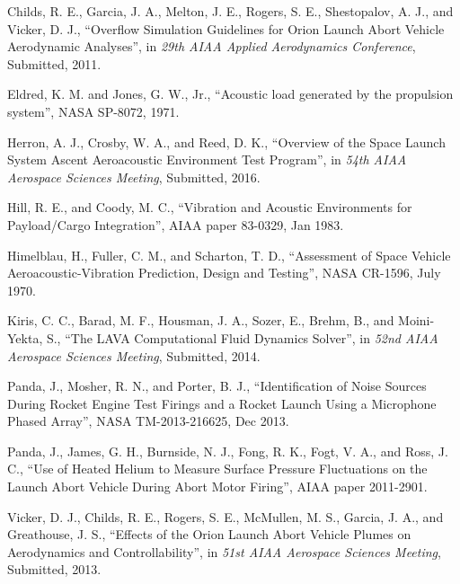 \documentclass[]{aiaa-tc}%
\begin{document}
\begin{thebibliography}{9}%

Childs, R. E., Garcia, J. A., Melton, J. E., Rogers, S. E., Shestopalov, A. J., and Vicker, D. J., ``Overflow Simulation Guidelines for Orion Launch
Abort Vehicle Aerodynamic Analyses'', in {\it 29th AIAA Applied Aerodynamics Conference}, Submitted, 2011.

Eldred, K. M. and Jones, G. W., Jr., ``Acoustic load generated by the propulsion system'', NASA SP-8072, 1971.

Herron, A. J., Crosby, W. A., and Reed, D. K., ``Overview of the Space Launch System Ascent Aeroacoustic Environment Test Program'', in {\it 54th AIAA Aerospace Sciences Meeting}, Submitted, 2016.

Hill, R. E., and Coody, M. C., ``Vibration and Acoustic Environments for Payload/Cargo Integration'', AIAA paper 83-0329, Jan 1983.

Himelblau, H., Fuller, C. M., and Scharton, T. D., ``Assessment of Space Vehicle Aeroacoustic-Vibration Prediction, Design and Testing'', NASA CR-1596, July 1970.

Kiris, C. C., Barad, M. F., Housman, J. A., Sozer, E., Brehm, B., and Moini-Yekta, S.,  ``The LAVA Computational Fluid Dynamics Solver'', in {\it 52nd AIAA Aerospace Sciences Meeting}, Submitted, 2014.

Panda, J., Mosher, R. N., and Porter, B. J., ``Identification of Noise Sources During Rocket Engine Test Firings and a Rocket Launch Using a Microphone Phased Array'', NASA TM-2013-216625, Dec 2013.

Panda, J., James, G. H., Burnside, N. J., Fong, R. K., Fogt, V. A., and Ross, J. C., ``Use of Heated Helium to Measure Surface Pressure Fluctuations on the Launch Abort Vehicle During Abort Motor Firing'', AIAA paper 2011-2901.

Vicker, D. J., Childs, R. E., Rogers, S. E., McMullen, M. S., Garcia, J. A., and Greathouse, J. S.,  ``Effects of the Orion Launch Abort Vehicle Plumes on Aerodynamics and Controllability'', in {\it 51st AIAA Aerospace Sciences Meeting}, Submitted, 2013.





\end{thebibliography}
\end{document}
